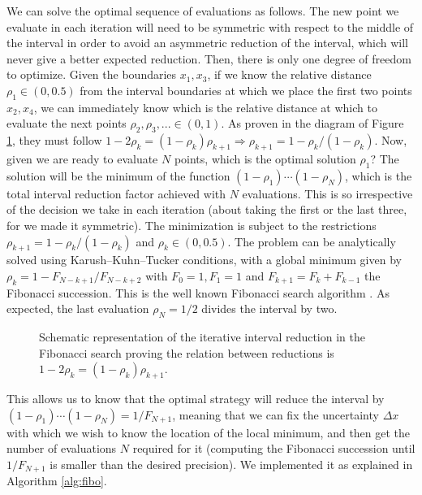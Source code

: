 \documentclass[11pt, a4paper, twoside]{article} %
\begin{document}
We can solve the optimal sequence of evaluations as follows. The new point we evaluate in each iteration will need to be symmetric with respect to the middle of the interval in order to avoid an asymmetric reduction of the interval, which will never give a better expected reduction. Then, there is only one degree of freedom to optimize. Given the boundaries $x_1, x_3$, if we know the relative distance $\rho_1\in(0,0.5)$ from the interval boundaries at which we place the first two points $x_2,x_4$, we can immediately know which is the relative distance at which to evaluate the next points $\rho_2,\rho_3,...\in(0,1)$. As proven in the diagram of Figure \ref{fig:fibo}, they must follow $1-2\rho_k=(1-\rho_k)\rho_{k+1}\Rightarrow \rho_{k+1}=1-\rho_k/(1-\rho_k)$. Now, given we are ready to evaluate $N$ points, which is the optimal solution $\rho_1$? The solution will be the minimum of the function $(1-\rho_1)\cdots(1-\rho_N)$, which is the total interval reduction factor achieved with $N$ evaluations. This is so irrespective of the decision we take in each iteration (about taking the first or the last three, for we made it symmetric). The minimization is subject to the restrictions $\rho_{k+1}=1-\rho_k/(1-\rho_k)$ and $\rho_k\in(0,0.5)$. The problem can be analytically solved using Karush–Kuhn–Tucker conditions, with a global minimum given by $\rho_k=1-F_{N-k+1}/F_{N-k+2}$ with $F_0=1,F_1=1$ and $F_{k+1}=F_k+F_{k-1}$ the Fibonacci succession. This is the well known Fibonacci search algorithm \cite{fibo, opt}. As expected, the last evaluation $\rho_N=1/2$ divides the interval by two. 
\begin{figure}[h!] 
     \centering 
    \caption{Schematic representation of the iterative interval reduction in the Fibonacci search proving the relation between reductions is $1-2\rho_k=(1-\rho_k)\rho_{k+1}$.}
    \label{fig:fibo}
\end{figure}


This allows us to know that the optimal strategy will reduce the interval by $(1-\rho_1)\cdots(1-\rho_N)=1/F_{N+1}$, meaning that we can fix the uncertainty $\Delta x$ with which we wish to know the location of the local minimum, and then get the number of evaluations $N$ required for it (computing the Fibonacci succession until $1/F_{N+1}$ is smaller than the desired precision). We implemented it as explained in Algorithm \ref{alg:fibo}.
\end{document}
